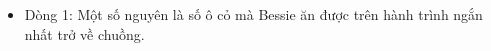 \begin{itemize}
	\item     Dòng 1: Một số nguyên là số ô cỏ mà Bessie ăn được trên hành        trình ngắn nhất trở về chuồng.   
\end{itemize}